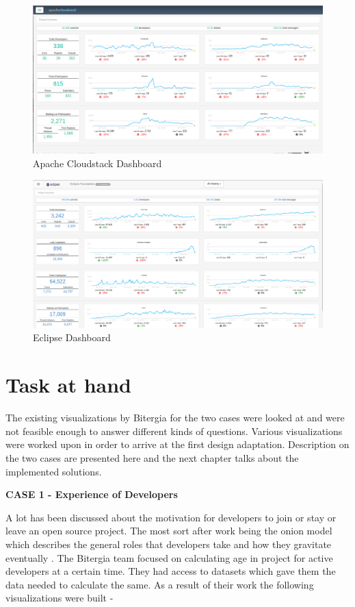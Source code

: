 \documentclass[seploa]{beavtex}
\begin{document}
\begin{figure}[H]
\centering
\includegraphics[width=120mm]{apache.png}
\caption{Apache Cloudstack Dashboard}
\end{figure}

\begin{figure}[H]
\centering
\includegraphics[width=120mm]{eclipse.png}
\caption{Eclipse Dashboard}
\end{figure}

\section{Task at hand}
The existing visualizations by Bitergia for the two cases were looked at and were not feasible enough to answer different kinds of questions. Various visualizations were worked upon in order to arrive at the first design adaptation. Description on the two cases are presented here and the next chapter talks about the implemented solutions.

\textbf{CASE 1 - Experience of Developers}

A lot has been discussed about the motivation for developers to join or stay or leave an open source project. The most sort after work being the onion model which describes the general roles that developers take and how they gravitate eventually \cite{crowston2005,  kishida2003}. The Bitergia team focused on calculating age in project for active developers at a certain time. They had access to datasets which gave them the data needed to calculate the same. As a result of their work the following visualizations were built - 
\end{document}
